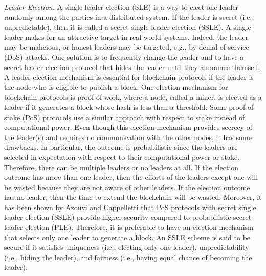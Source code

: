 \smallskip
\noindent \emph{Leader Election.} 
A single leader election (SLE) is a way to elect one leader randomly among the
parties in a distributed system. If the leader is secret (i.e., unpredictable), then it is called
a secret single leader election (SSLE).
A single leader makes for an attractive target in real-world systems. Indeed, the leader may be malicious, or honest leaders may be targeted, e.g.,
by denial-of-service (DoS) attacks. One solution is to frequently change the leader and
to have a secret leader election protocol that hides the leader until they announce themself.
A leader election mechanism is essential for blockchain protocols if the leader is
the node who is eligible to publish a block.
One election mechanism for blockchain protocols is proof-of-work, where a node, called a miner, is elected as a leader if it generates a block whose hash is less than a threshold. Some
proof-of-stake (PoS) protocols \cite{DaianPS19,KiayiasRDO17,DavidGKR18,Dfinity} use a similar approach with respect to stake instead of computational power. Even though this election mechanism provides secrecy of
the leader(s) and requires no communication with the other nodes, it has some drawbacks. In particular, the outcome is probabilistic since the leaders are selected in expectation
with respect to their computational power or stake. Therefore, there can be multiple leaders or
no leaders at all. If the election outcome has more than one leader, then the efforts of the leaders
except one will be wasted because they are not aware of other leaders. If the election outcome has
no leader, then the time to extend the blockchain will be wasted. Moreover,
it has been shown by Azouvi and Cappelletti \cite{AzouviC21} that PoS protocols with secret single leader
election (SSLE) provide higher security compared to probabilistic secret leader election (PLE).
Therefore, it is preferable to have an election mechanism that selects only one leader to generate a
block.
An SSLE scheme is said to be secure \cite{BonehEHG20} if it satisfies uniqueness (i.e., electing only one leader), unpredictability (i.e., hiding the leader), and fairness (i.e., having equal chance of becoming the leader).

